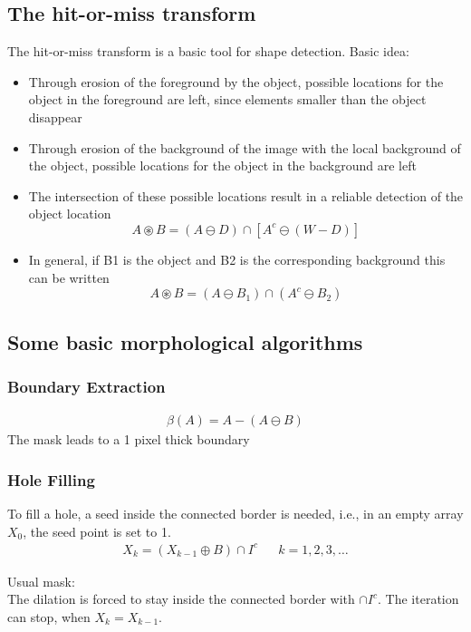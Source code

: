 \subsection{The hit-or-miss transform}
The hit-or-miss transform is a basic tool for shape detection. Basic idea:
\begin{itemize}
	\item Through erosion of the foreground by the object, possible locations for the object in the foreground are left, since elements smaller than the object disappear

	\item Through erosion of the background of the image with the local background of the object, possible locations for the object in the background are left

	\item The intersection of these possible locations result in a reliable  detection of the object location
	\[
		A \circledast B = (A \ominus D) \cap [ A^c \ominus (W-D)]
	\]

	\item In general, if B1 is the object and B2 is the corresponding background this can be written
	\[
		A \circledast B = (A \ominus B_1)\cap (A^c \ominus B_2)
	\]
\end{itemize}


\subsection{Some basic morphological algorithms}
\subsubsection{Boundary Extraction}
\begin{multicols}{2}
	\begin{align*}
		\beta(A)=A-(A\ominus B)
	\end{align*}
	The mask \quad {} \quad leads to a 1 pixel thick boundary
\end{multicols}

\subsubsection{Hole Filling}
\begin{multicols}{2}
To fill a hole, a seed inside the connected border is needed, i.e., in an empty array $X_0$, the seed point is set to 1.
\begin{align*}
X_k=(X_{k-1}\oplus B)\cap I^c && k=1,2,3,\ldots
\end{align*}

Usual mask:  \\

The dilation is forced to stay inside the connected border with $\cap I^c$.
The iteration can stop, when $X_k = X_{k-1}$.
\end{multicols}


